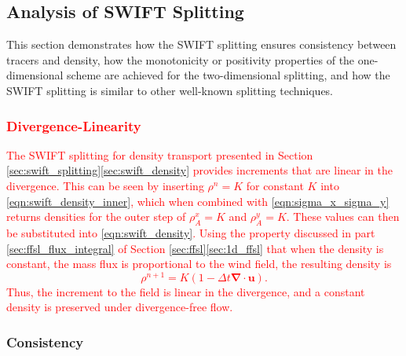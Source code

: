 \documentclass{ametsocV6.1}
\newcommand{\change}[1]{\textcolor{red}{#1}}
\begin{document}
\subsection{Analysis of SWIFT Splitting}

This section demonstrates how the SWIFT splitting ensures consistency between tracers and density, how the monotonicity or positivity properties of the one-dimensional scheme are achieved for the two-dimensional splitting, and how the SWIFT splitting is similar to other well-known splitting techniques. 

\subsubsection{\change{Divergence-Linearity}}

\change{The SWIFT splitting for density transport presented in Section \ref{sec:swift_splitting}\ref{sec:swift_density}
provides increments that are linear in the divergence.
This can be seen by inserting $\rho^n=K$ for constant $K$ into \eqref{eqn:swift_density_inner}, which when combined with \eqref{eqn:sigma_x_sigma_y} returns densities for the outer step of $\rho_A^x=K$ and $\rho_A^y=K$.
These values can then be substituted into \eqref{eqn:swift_density}.
Using the property discussed in part \ref{sec:ffsl_flux_integral} of Section \ref{sec:ffsl}\ref{sec:1d_ffsl} that when the density is constant, the mass flux is proportional to the wind field, the resulting density is
\begin{equation}
\rho^{n+1} = K(1-\Delta t \bm{\nabla\cdot u}).
\end{equation}
Thus, the increment to the field is linear in the divergence, and a constant density is preserved under divergence-free flow.}

\subsubsection{Consistency}
\end{document}
